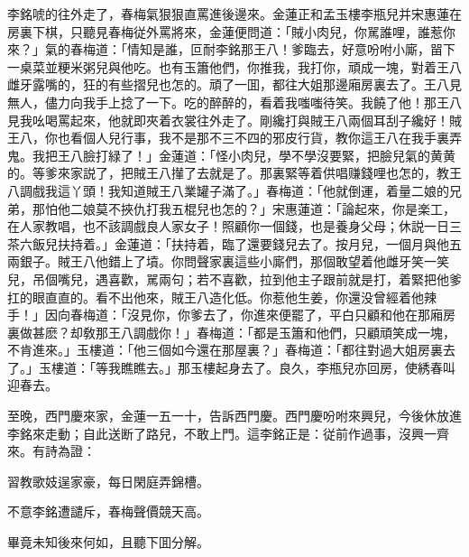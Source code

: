 李銘唬的往外走了，春梅氣狠狠直罵進後邊來。金蓮正和孟玉樓李瓶兒并宋惠蓮在房裏下棋，只聽見春梅従外罵將來，金蓮便問道：「賊小肉兒，你駡誰哩，誰惹你來？」氣的春梅道：「情知是誰，叵耐李銘那王八！爹臨去，好意吩咐小廝，㽞下一桌菜並粳米粥兒與他吃。也有玉簫他們，你推我，我打你，頑成一塊，對着王八雌牙露嘴的，狂的有些摺兒也怎的。頑了一囬，都往大姐那邊廂房裏去了。王八見無人，儘力向我手上捻了一下。吃的醉醉的，看着我嗤嗤待笑。我饒了他！那王八見我吆喝罵起來，他就即夾着衣裳往外走了。剛纔打與賊王八兩個耳刮子纔好！賊王八，你也看個人兒行事，我不是那不三不四的邪皮行貨，教你這王八在我手裏弄鬼。我把王八臉打緑了！」金蓮道：「怪小肉兒，學不學沒要緊，把臉兒氣的黄黄的。等爹來家説了，把賊王八攆了去就是了。那裏緊等着供唱赚錢哩也怎的，教王八調戲我這丫頭！我知道賊王八業罐子滿了。」春梅道：「他就倒運，着量二娘的兄弟，那怕他二娘莫不挾仇打我五棍兒也怎的？」宋惠蓮道：「論起來，你是楽工，在人家教唱，也不該調戲良人家女子！照顧你一個錢，也是養身父母；休説一日三茶六飯兒扶持着。」金蓮道：「扶持着，臨了還要錢兒去了。按月兒，一個月與他五兩銀子。賊王八他錯上了墳。你問聲家裏這些小廝們，那個敢望着他雌牙笑一笑兒，吊個嘴兒，遇喜歡，駡兩句；若不喜歡，拉到他主子跟前就是打，着緊把他爹扛的眼直直的。看不出他來，賊王八造化低。你惹他生姜，你還没曾經着他辣手！」因向春梅道：「沒見你，你爹去了，你進來便罷了，平白只顧和他在那廂房裏做甚麽？却敎那王八調戲你！」春梅道：「都是玉簫和他們，只顧頑笑成一塊，不肯進來。」玉樓道：「他三個如今還在那屋裏？」春梅道：「都往對過大姐房裏去了。」玉樓道：「等我瞧瞧去。」那玉樓起身去了。良久，李瓶兒亦回房，使綉春叫迎春去。

至晚，西門慶來家，金蓮一五一十，告訴西門慶。西門慶吩咐來興兒，今後休放進李銘來走動；自此送断了路兒，不敢上門。這李銘正是：従前作過事，沒興一齊來。有詩為證：

習教歌妓逞家豪，每日閑庭弄錦槽。

不意李銘遭譴斥，春梅聲價競天高。

畢竟未知後來何如，且聽下囬分解。

